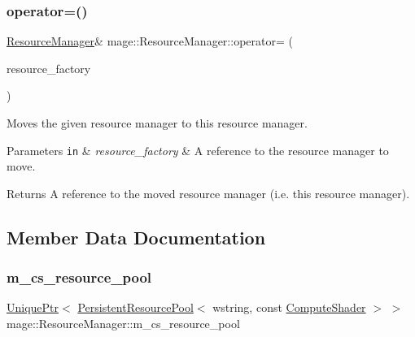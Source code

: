 \subsubsection{\texorpdfstring{operator=()}{operator=()}\hspace{0.1cm}{\footnotesize\ttfamily [2/2]}}
{\footnotesize\ttfamily \hyperlink{classmage_1_1_resource_manager}{Resource\+Manager}\& mage\+::\+Resource\+Manager\+::operator= (\begin{DoxyParamCaption}\item[{\hyperlink{classmage_1_1_resource_manager}{Resource\+Manager} \&\&}]{resource\+\_\+factory }\end{DoxyParamCaption})\hspace{0.3cm}{\ttfamily [delete]}}

Moves the given resource manager to this resource manager.


\begin{DoxyParams}[1]{Parameters}
\mbox{\tt in}  & {\em resource\+\_\+factory} & A reference to the resource manager to move. \\
\hline
\end{DoxyParams}
\begin{DoxyReturn}{Returns}
A reference to the moved resource manager (i.\+e. this resource manager). 
\end{DoxyReturn}


\subsection{Member Data Documentation}
\hypertarget{classmage_1_1_resource_manager_a5c363073fa94f73193faaa1f65365299}{}\label{classmage_1_1_resource_manager_a5c363073fa94f73193faaa1f65365299} 
\subsubsection{\texorpdfstring{m\+\_\+cs\+\_\+resource\+\_\+pool}{m\_cs\_resource\_pool}}
{\footnotesize\ttfamily \hyperlink{namespacemage_a3316d7143a973e37adf1110f2e80ca31}{Unique\+Ptr}$<$ \hyperlink{classmage_1_1_persistent_resource_pool}{Persistent\+Resource\+Pool}$<$ wstring, const \hyperlink{namespacemage_ae040329401484b076f0cd1a7c43d19c9}{Compute\+Shader} $>$ $>$ mage\+::\+Resource\+Manager\+::m\+\_\+cs\+\_\+resource\+\_\+pool\hspace{0.3cm}{\ttfamily [private]}}

